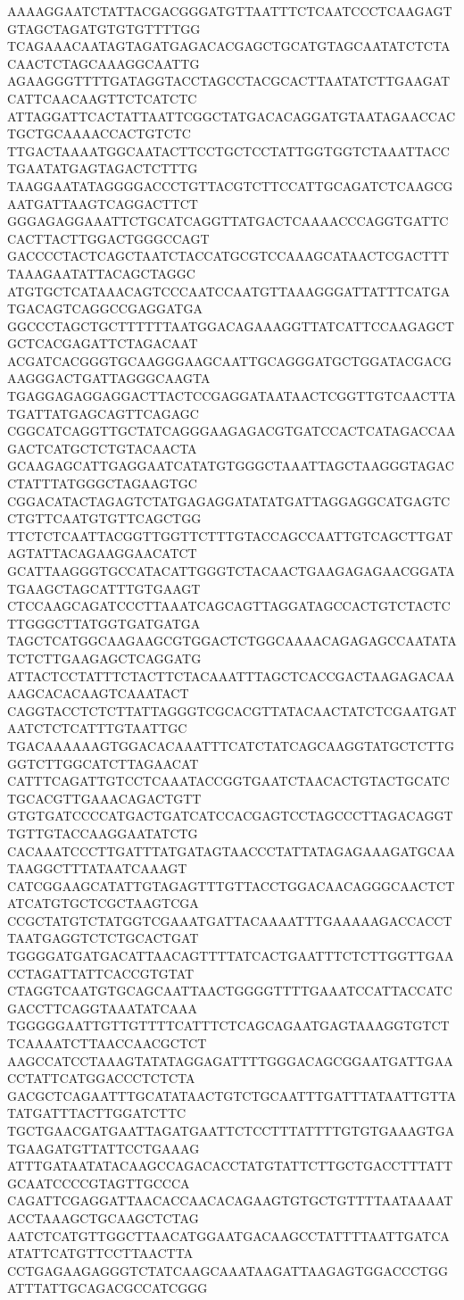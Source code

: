 AAAAGGAATCTATTACGACGGGATGTTAATTTCTCAATCCCTCAAGAGTGTAGCTAGATGTGTGTTTTGG
TCAGAAACAATAGTAGATGAGACACGAGCTGCATGTAGCAATATCTCTACAACTCTAGCAAAGGCAATTG
AGAAGGGTTTTGATAGGTACCTAGCCTACGCACTTAATATCTTGAAGATCATTCAACAAGTTCTCATCTC
ATTAGGATTCACTATTAATTCGGCTATGACACAGGATGTAATAGAACCACTGCTGCAAAACCACTGTCTC
TTGACTAAAATGGCAATACTTCCTGCTCCTATTGGTGGTCTAAATTACCTGAATATGAGTAGACTCTTTG
TAAGGAATATAGGGGACCCTGTTACGTCTTCCATTGCAGATCTCAAGCGAATGATTAAGTCAGGACTTCT
GGGAGAGGAAATTCTGCATCAGGTTATGACTCAAAACCCAGGTGATTCCACTTACTTGGACTGGGCCAGT
GACCCCTACTCAGCTAATCTACCATGCGTCCAAAGCATAACTCGACTTTTAAAGAATATTACAGCTAGGC
ATGTGCTCATAAACAGTCCCAATCCAATGTTAAAGGGATTATTTCATGATGACAGTCAGGCCGAGGATGA
GGCCCTAGCTGCTTTTTTAATGGACAGAAAGGTTATCATTCCAAGAGCTGCTCACGAGATTCTAGACAAT
ACGATCACGGGTGCAAGGGAAGCAATTGCAGGGATGCTGGATACGACGAAGGGACTGATTAGGGCAAGTA
TGAGGAGAGGAGGACTTACTCCGAGGATAATAACTCGGTTGTCAACTTATGATTATGAGCAGTTCAGAGC
CGGCATCAGGTTGCTATCAGGGAAGAGACGTGATCCACTCATAGACCAAGACTCATGCTCTGTACAACTA
GCAAGAGCATTGAGGAATCATATGTGGGCTAAATTAGCTAAGGGTAGACCTATTTATGGGCTAGAAGTGC
CGGACATACTAGAGTCTATGAGAGGATATATGATTAGGAGGCATGAGTCCTGTTCAATGTGTTCAGCTGG
TTCTCTCAATTACGGTTGGTTCTTTGTACCAGCCAATTGTCAGCTTGATAGTATTACAGAAGGAACATCT
GCATTAAGGGTGCCATACATTGGGTCTACAACTGAAGAGAGAACGGATATGAAGCTAGCATTTGTGAAGT
CTCCAAGCAGATCCCTTAAATCAGCAGTTAGGATAGCCACTGTCTACTCTTGGGCTTATGGTGATGATGA
TAGCTCATGGCAAGAAGCGTGGACTCTGGCAAAACAGAGAGCCAATATATCTCTTGAAGAGCTCAGGATG
ATTACTCCTATTTCTACTTCTACAAATTTAGCTCACCGACTAAGAGACAAAAGCACACAAGTCAAATACT
CAGGTACCTCTCTTATTAGGGTCGCACGTTATACAACTATCTCGAATGATAATCTCTCATTTGTAATTGC
TGACAAAAAAGTGGACACAAATTTCATCTATCAGCAAGGTATGCTCTTGGGTCTTGGCATCTTAGAACAT
CATTTCAGATTGTCCTCAAATACCGGTGAATCTAACACTGTACTGCATCTGCACGTTGAAACAGACTGTT
GTGTGATCCCCATGACTGATCATCCACGAGTCCTAGCCCTTAGACAGGTTGTTGTACCAAGGAATATCTG
CACAAATCCCTTGATTTATGATAGTAACCCTATTATAGAGAAAGATGCAATAAGGCTTTATAATCAAAGT
CATCGGAAGCATATTGTAGAGTTTGTTACCTGGACAACAGGGCAACTCTATCATGTGCTCGCTAAGTCGA
CCGCTATGTCTATGGTCGAAATGATTACAAAATTTGAAAAAGACCACCTTAATGAGGTCTCTGCACTGAT
TGGGGATGATGACATTAACAGTTTTATCACTGAATTTCTCTTGGTTGAACCTAGATTATTCACCGTGTAT
CTAGGTCAATGTGCAGCAATTAACTGGGGTTTTGAAATCCATTACCATCGACCTTCAGGTAAATATCAAA
TGGGGGAATTGTTGTTTTCATTTCTCAGCAGAATGAGTAAAGGTGTCTTCAAAATCTTAACCAACGCTCT
AAGCCATCCTAAAGTATATAGGAGATTTTGGGACAGCGGAATGATTGAACCTATTCATGGACCCTCTCTA
GACGCTCAGAATTTGCATATAACTGTCTGCAATTTGATTTATAATTGTTATATGATTTACTTGGATCTTC
TGCTGAACGATGAATTAGATGAATTCTCCTTTATTTTGTGTGAAAGTGATGAAGATGTTATTCCTGAAAG
ATTTGATAATATACAAGCCAGACACCTATGTATTCTTGCTGACCTTTATTGCAATCCCCGTAGTTGCCCA
CAGATTCGAGGATTAACACCAACACAGAAGTGTGCTGTTTTAATAAAATACCTAAAGCTGCAAGCTCTAG
AATCTCATGTTGGCTTAACATGGAATGACAAGCCTATTTTAATTGATCAATATTCATGTTCCTTAACTTA
CCTGAGAAGAGGGTCTATCAAGCAAATAAGATTAAGAGTGGACCCTGGATTTATTGCAGACGCCATCGGG
